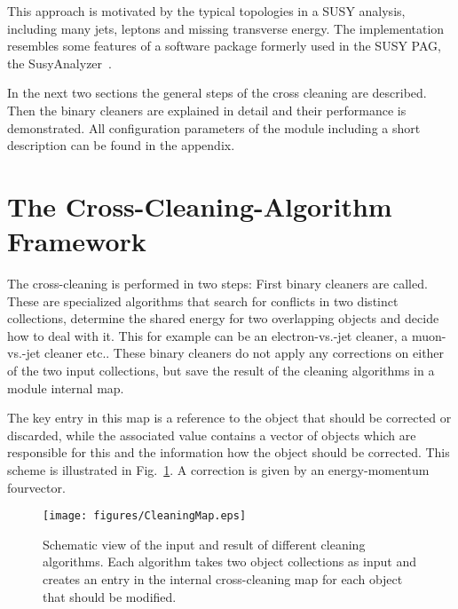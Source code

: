 \documentclass{cmspaper}
\begin{document}
This approach is motivated by the typical topologies in a SUSY analysis,
including many jets, leptons and missing transverse energy. The implementation
resembles some features of a software package formerly used in the SUSY PAG,
the SusyAnalyzer~\cite{wikiSusyAnalyzer}.

In the next two sections the general steps of the cross cleaning are described.
Then the binary cleaners are explained in detail and their performance is
demonstrated. All configuration parameters of the module including a short
description can be found in the appendix.


\section{The Cross-Cleaning-Algorithm Framework}
The cross-cleaning is performed in two steps: First binary cleaners are called.
These are specialized algorithms that search for conflicts in two distinct
collections, determine the shared energy for two overlapping objects and decide
how to deal with it. This for example can be an electron-vs.-jet cleaner, a
muon-vs.-jet cleaner etc.. These binary cleaners do not apply any corrections
on either of the two input collections, but save the result of the cleaning
algorithms in a module internal map.

The key entry in this map is a reference to the object that should be corrected
or discarded, while the associated value contains a vector of objects which are
responsible for this and the information how the object should be corrected. This
scheme is illustrated in Fig.~\ref{fig:Cleaning}. A correction is given by an
energy-momentum fourvector.

\begin{figure}[hbt]
\begin{center}
\texttt{[image: figures/CleaningMap.eps]}
\caption{Schematic view of the input and result of different cleaning
    algorithms. Each algorithm takes two object collections as input and
    creates an entry in the internal cross-cleaning map for each object
    that should be modified.}
\label{fig:Cleaning}
\end{center}
\end{figure}
\end{document}
